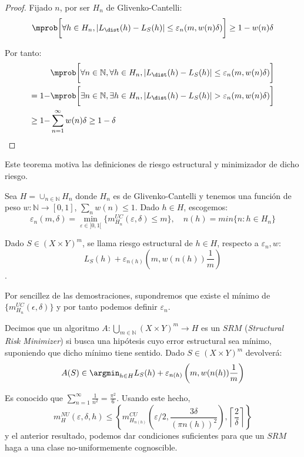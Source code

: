   \begin{proof}
   Fijado $n$, por ser $H_n$ de Glivenko-Cantelli:
   \[
     \mprob\bigg[\forall h\in H_n, |L_{\dist}(h) - L_S(h)| \le \varepsilon_n (m, w(n)\delta)\bigg] \ge 1- w(n) \delta
   \]

   Por tanto:
   \begin{align*}
          &\mprob \bigg[\forall n\in \mathbb{N}, \forall h\in H_n, |L_{\dist}(h) - L_S(h)| \le \varepsilon_n (m, w(n) \delta)\bigg]\\
   = 1 -  &\mprob\bigg[\exists n\in \mathbb{N}, \exists h\in H_n, |L_{\dist}(h) - L_S(h)| > \varepsilon_n (m, w(n) \delta)\bigg]\\
   \ge 1- &\sum_{n=1}^{\infty} w(n) \delta \ge 1-\delta
   \end{align*}
  \end{proof}

Este teorema motiva las definiciones de riesgo estructural y minimizador de dicho riesgo.

\begin{definition}
Sea $H = \cup_{n\in \mathbb{N}} H_n$ donde $H_n$ es de Glivenko-Cantelli y tenemos una función de peso
$w : \mathbb{N} \rightarrow [0,1]$, $\sum_n w(n) \le 1$. Dado $h\in H$, escogemos:
\[
  \varepsilon_n (m,\delta) = \min_{\varepsilon \in ]0,1[}\{m_{H_n}^{UC} (\varepsilon, \delta) \le m\}, \quad n(h) = min\{n: h\in H_n\}
\]

Dado $S\in (X\times Y)^m$, se llama riesgo estructural de $h\in H$, respecto a $\varepsilon_n, w$:
\[L_S(h) + \varepsilon_{n(h)} \left(m, w(n(h))\frac{1}{m}\right)\].
\end{definition}

Por sencillez de las demostraciones, supondremos que existe el mínimo de $\{m_{H_n}^{UC}(\epsilon, \delta)\}$ y por tanto
podemos definir $\varepsilon_n$.

\begin{definition}
Decimos que un algoritmo $A: \underset{m\in \mathbb{N}}{\bigcup} (X\times Y)^m \rightarrow H$ es un $SRM$ 
(\textit{Structural Risk Minimizer}) si busca una hipótesis cuyo error estructural sea mínimo, suponiendo que
dicho mínimo tiene sentido. Dado $S \in (X\times Y)^m$ devolverá:
\[
  A(S) \in \argmin_{h\in H} L_S(h) + \varepsilon_{n(h)} \left(m, w(n(h))\frac{1}{m}\right)
\]
\end{definition}

Es conocido que $\sum_{n=1}^\infty \frac{1}{n^2} = \frac{\pi^2}{6}$. Usando este hecho,
\[
  m_{H}^{NU} (\varepsilon, \delta, h) \le \left\{m_{H_{n(h)}}^{CU} \left(\varepsilon/2, \frac{3 \delta}{(\pi n(h))^2} \right), 
  \left\lceil\frac{2}{\delta}\right\rceil \right\}
\] 
y el anterior resultado, podemos dar condiciones suficientes para que un $SRM$ haga a una clase no-uniformemente
cognoscible.

